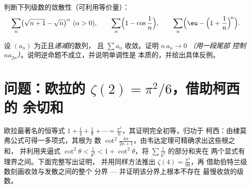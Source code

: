 \begin{exercise}[$\star\star$]\label{exo:b2:series:11}
判断下列级数的敛散性（可利用等价量）：
\[
\sum_n \bigl(\sqrt{n+1} - \sqrt n\bigr)^{\alpha}
\ (\alpha > 0), \qquad
\sum_n \Bigl(1 - \cos\frac1n\Bigr), \qquad
\sum_n \Bigl(\eu - \Bigl(1 + \frac1n\Bigr)^{\!n}\Bigr).
\]
\end{exercise}

\begin{exercise}[$\star\star\star$]\label{exo:b2:series:12}
设 $(a_n)$ 为正且\emph{递减}的数列，
且 $\sum a_n$ 收敛。证明 $n\,a_n \to 0$ \emph{（用一段尾部
控制 $n a_{2n}$）}。说明逆命题不成立，并说明单调性是
本质的，并给出具体反例。
\end{exercise}

\section{问题：欧拉的 $\zeta(2) = \pi^2/6$，借助柯西的
余切和}

欧拉最著名的恒等式 $1 + \frac14 + \frac19 + \cdots =
\frac{\pi^2}6$，其证明完全初等，归功于
柯西：由棣莫弗公式可得一多项式，其根为
数 $\cot^2\frac{k\pi}{2n+1}$，由韦达定理可精确求出这些根之和，
并利用夹逼式 $\cot^2\theta < \frac{1}{\theta^2} <
1 + \cot^2\theta$，将 $\sum\frac1{k^2}$ 的部分和夹在
两个显式有理界之间。下面完整写出证明，
并用同样方法推出 $\zeta(4) = \frac{\pi^4}{90}$，再
借助伯特兰级数刻画收敛与发散之间的整个
分界 --- 并证明该分界上根本不存在
最慢收敛的级数。


